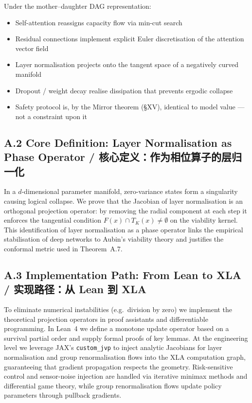 \documentclass[11pt,a4paper]{article}
\theoremstyle{definition}
\theoremstyle{remark}
\begin{document}
Under the mother--daughter DAG representation:
\begin{itemize}[nosep]
  \item Self-attention reassigns capacity flow via min-cut search
  \item Residual connections implement explicit Euler discretisation of the attention vector field
  \item Layer normalisation projects onto the tangent space of a negatively curved manifold
  \item Dropout / weight decay realise dissipation that prevents ergodic collapse
  \item Safety protocol is, by the Mirror theorem (\S XV), identical to model value --- not a constraint upon it
\end{itemize}


\subsection*{A.2 Core Definition: Layer Normalisation as Phase Operator / 核心定义：作为相位算子的层归一化}

In a $d$-dimensional parameter manifold, zero-variance states form a singularity causing logical collapse. We prove that the Jacobian of layer normalisation is an orthogonal projection operator: by removing the radial component at each step it enforces the tangential condition $F(x) \cap T_K(x) \neq \emptyset$ on the viability kernel. This identification of layer normalisation as a phase operator links the empirical stabilisation of deep networks to Aubin's viability theory and justifies the conformal metric used in Theorem~A.7.


\subsection*{A.3 Implementation Path: From Lean to XLA / 实现路径：从 Lean 到 XLA}

To eliminate numerical instabilities (e.g.\ division by zero) we implement the theoretical projection operators in proof assistants and differentiable programming. In Lean~4 we define a monotone update operator based on a survival partial order and supply formal proofs of key lemmas. At the engineering level we leverage JAX's \texttt{custom\_jvp} to inject analytic Jacobians for layer normalisation and group renormalisation flows into the XLA computation graph, guaranteeing that gradient propagation respects the geometry. Risk-sensitive control and sensor-noise injection are handled via iterative minimax methods and differential game theory, while group renormalisation flows update policy parameters through pullback gradients.
\end{document}
